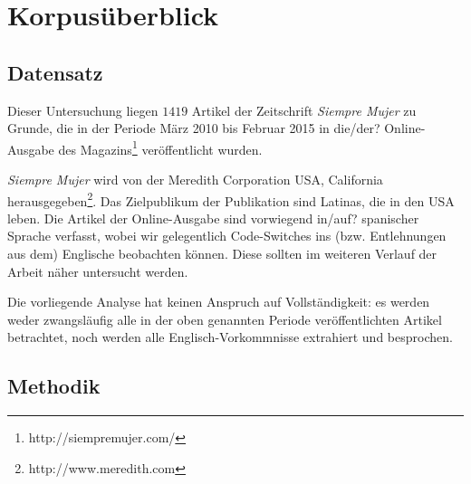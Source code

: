 \section{Korpusüberblick}


\subsection{Datensatz}

Dieser Untersuchung liegen $1419$ Artikel der Zeitschrift \textit{Siempre Mujer} zu Grunde,
die in der Periode März 2010 bis Februar 2015 in die/der? Online-Ausgabe des Magazins\footnote{http://siempremujer.com/} veröffentlicht wurden.

\textit{Siempre Mujer} wird von der Meredith Corporation USA, California herausgegeben\footnote{http://www.meredith.com}.
Das Zielpublikum der Publikation sind Latinas, die in den USA leben. %
Die Artikel der Online-Ausgabe sind vorwiegend in/auf? spanischer Sprache verfasst,
wobei wir gelegentlich Code-Switches ins (bzw. Entlehnungen aus dem) Englische beobachten können.
Diese sollten im weiteren Verlauf der Arbeit näher untersucht werden.

Die vorliegende Analyse hat keinen Anspruch auf Vollständigkeit:
es werden weder zwangsläufig alle in der oben genannten Periode veröffentlichten Artikel betrachtet,
noch werden alle Englisch-Vorkommnisse extrahiert und besprochen.



\subsection{Methodik}

